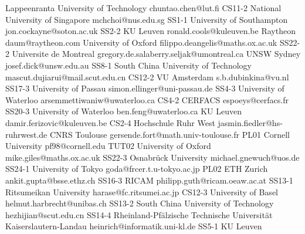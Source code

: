 \begin{multicols}{2}
{}
{}
{ Lappeenranta University of Technology }
{ chuntao.chen@lut.fi }
{CS11-2}
{}
{ National University of Singapore }
{ mchchoi@nus.edu.sg }
{SS1-1}
{}
{ University of Southampton }
{ jon.cockayne@soton.ac.uk }
{SS2-2}
{}
{ KU Leuven }
{ ronald.cools@kuleuven.be }
{}
{}
{ Raytheon }
{ daum@raytheon.com }
{}
{}
{ University of Oxford }
{ filippo.deangelis@maths.ox.ac.uk }
{SS22-2}
{}
{ Universite de Montreal }
{ gregory.de.salaberry.seljak@umontreal.ca }
{}
{}
{ UNSW Sydney }
{ josef.dick@unsw.edu.au }
{SS8-1}
{}
{ South China University of Technology }
{ mascut.dujiarui@mail.scut.edu.cn }
{CS12-2}
{}
{ VU Amsterdam }
{ s.b.dubinkina@vu.nl }
{SS17-3}
{}
{ University of Passau }
{ simon.ellinger@uni-passau.de }
{SS4-3}
{}
{ University of Waterloo }
{ arsemmettiwaniw@uwaterloo.ca }
{CS4-2}
{}
{ CERFACS }
{ espoeys@cerfacs.fr }
{SS20-3}
{}
{ University of Waterloo }
{ ben.feng@uwaterloo.ca }
{}
{}
{ KU Leuven }
{ damir.ferizovic@kuleuven.be }
{CS2-4}
{}
{ Hochschule Ruhr West }
{ jasmin.fiedler@hs-ruhrwest.de }
{}
{}
{ CNRS Toulouse }
{ gersende.fort@math.univ-toulouse.fr }
{PL01}
{}
{ Cornell University }
{ pf98@cornell.edu }
{TUT02}
{}
{ University of Oxford }
{ mike.giles@maths.ox.ac.uk }
{SS22-3}
{}
{ Osnabrück University }
{ michael.gnewuch@uos.de }
{SS24-1}
{}
{ University of Tokyo }
{ goda@frcer.t.u-tokyo.ac.jp }
{PL02}
{}
{ ETH Zurich }
{ ankit.gupta@bsse.ethz.ch }
{SS16-3}
{}
{ RICAM }
{ philipp.guth@ricam.oeaw.ac.at }
{SS13-1}
{}
{ Ritsumeikan University }
{ harase@fc.ritsumei.ac.jp }
{CS12-3}
{}
{ University of Basel }
{ helmut.harbrecht@unibas.ch }
{SS13-2}
{}
{ South China University of Technology }
{ hezhijian@scut.edu.cn }
{SS14-4}
{}
{ Rheinland-Pfälzische Technische Universität Kaiserslautern-Landau }
{ heinrich@informatik.uni-kl.de }
{SS5-1}
{}
{ KU Leuven }

\end{multicols}
